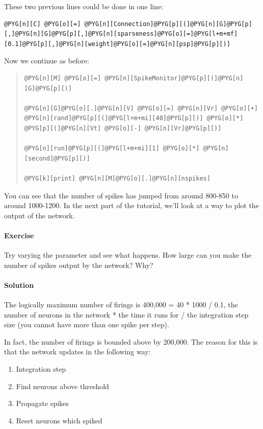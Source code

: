 \documentclass[letterpaper,10pt,english]{manual}
\begin{document}
These two previous lines could be done in one line:

\begin{Verbatim}[commandchars=@\[\]]
@PYG[n][C] @PYG[o][=] @PYG[n][Connection]@PYG[p][(]@PYG[n][G]@PYG[p][,]@PYG[n][G]@PYG[p][,]@PYG[n][sparseness]@PYG[o][=]@PYG[l+m+mf][0.1]@PYG[p][,]@PYG[n][weight]@PYG[o][=]@PYG[n][psp]@PYG[p][)]
\end{Verbatim}

Now we continue as before:
\begin{quote}

\begin{Verbatim}[commandchars=@\[\]]
@PYG[n][M] @PYG[o][=] @PYG[n][SpikeMonitor]@PYG[p][(]@PYG[n][G]@PYG[p][)]

@PYG[n][G]@PYG[o][.]@PYG[n][V] @PYG[o][=] @PYG[n][Vr] @PYG[o][+] @PYG[n][rand]@PYG[p][(]@PYG[l+m+mi][40]@PYG[p][)] @PYG[o][*] @PYG[p][(]@PYG[n][Vt] @PYG[o][-] @PYG[n][Vr]@PYG[p][)]

@PYG[n][run]@PYG[p][(]@PYG[l+m+mi][1] @PYG[o][*] @PYG[n][second]@PYG[p][)]

@PYG[k][print] @PYG[n][M]@PYG[o][.]@PYG[n][nspikes]
\end{Verbatim}
\end{quote}

You can see that the number of spikes has jumped from around
800-850 to around 1000-1200. In the next part of the tutorial,
we'll look at a way to plot the output of the network.


\paragraph{Exercise}

Try varying the parameter  and see what happens. How large
can you make the number of spikes output by the network? Why?


\paragraph{Solution}

The logically maximum number of firings is
400,000 = 40 * 1000 / 0.1, the number of neurons in the
network * the time it runs for / the integration step size (you
cannot have more than one spike per step).

In fact, the number of firings is bounded above by 200,000. The
reason for this is that the network updates in the following way:
\begin{enumerate}
\item {} 
Integration step

\item {} 
Find neurons above threshold

\item {} 
Propagate spikes

\item {} 
Reset neurons which spiked

\end{enumerate}
\end{document}
